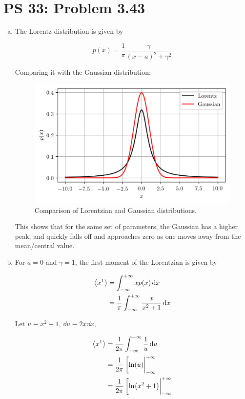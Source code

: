 \documentclass[12pt,a4paper,twocolumn]{article}
\begin{document}
\setcounter{page}{1}

\section*{PS 33: Problem 3.43}
\bigskip

\begin{enumerate}[(a)]

\item The Lorentz distribution is given by

\begin{equation}\label{eq:lorentz}
	p(x) = \frac{1}{\pi}\frac{\gamma}{(x-a)^2 + \gamma^2}
\end{equation}

Comparing it with the Gaussian distribution:

\begin{figure}[!h]
	\centering
	\includegraphics[width=\linewidth]{lorentz.png}
	\caption{Comparison of Lorentzian and Gaussian distributions.}
	\label{fig:compare}
\end{figure}

This shows that for the same set of parameters, the Gaussian has a higher peak, and quickly falls off and approaches zero as one moves away from the mean/central value.

\item For $a = 0$ and $\gamma = 1$, the first moment of the Lorentzian is given by

\begin{align}
	\ev{x^1} &= \int_{-\infty}^{+\infty} xp(x) \dd{x} \\
	&= \frac{1}{\pi} \int_{-\infty}^{+\infty} \frac{x}{x^2 + 1} \dd{x} \nonumber
\end{align}

Let $u \equiv x^2 + 1$, $\dd{u} \equiv 2x\dd{x}$,

\begin{align}
	\ev{x^1} &= \frac{1}{2\pi} \int_{-\infty}^{+\infty} \frac{1}{u}\dd{u} \nonumber \\
	&= \frac{1}{2\pi} \eval[\ln(u)|_{-\infty}^{+\infty} \nonumber \\
	&= \frac{1}{2\pi} \eval[\ln(x^2 + 1)|_{-\infty}^{+\infty} \nonumber
\end{align}

\end{enumerate}
\end{document}
